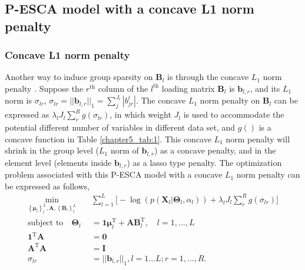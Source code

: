 \subsection{P-ESCA model with a concave L1 norm penalty}
\subsubsection{Concave L1 norm penalty}
Another way to induce group sparsity on $\mathbf{B}_l$ is through the concave $L_1$ norm penalty \cite{huang2012selective}. Suppose the $r^{\text{th}}$ column of the $l^{\text{th}}$ loading matrix $\mathbf{B}_l$ is $\mathbf{b}_{l,r}$, and its $L_1$ norm is $\sigma_{lr}$, $\sigma_{lr} = ||\mathbf{b}_{l,r}||_1 = \sum_{j}^{J_l} |b_{jr}^l|$. The concave $L_1$ norm penalty on $\mathbf{B}_l$ can be expressed as $\lambda_l J_l \sum_{r}^{R} g(\sigma_{lr})$, in which weight $J_l$ is used to accommodate the potential different number of variables in different data set, and $g()$ is a concave function in Table \ref{chapter5_tab:1}. This concave $L_1$ norm penalty will shrink in the group level ($L_1$ norm of $\mathbf{b}_{l,r}$) as a concave penalty, and in the element level (elements inside $\mathbf{b}_{l,r}$) as a lasso type penalty. The optimization problem associated with this P-ESCA model with a concave $L_1$ norm penalty can be expressed as follows,
\begin{equation}\label{chapter6_eq:2}
\begin{aligned}
    \min_{ \left\{\bm{\mu}_l\right\}_{l}^{L}, \mathbf{A}, \left\{\mathbf{B}_l\right\}_{l}^{L}} \quad & \sum_{l=1}^{L} \Big[ -\log(p(\mathbf{X}_l|\mathbf{\Theta}_l, \alpha_l)) + \lambda_l J_l \sum_{r}^{R} g(\sigma_{lr}) \Big] \\
    \text{subject to} \quad \mathbf{\Theta}_l &= \mathbf{1}\bm{\mu}_l^{\text{T}} + \mathbf{AB}_l^{\text{T}}, \quad l = 1,\ldots,L \\
     \mathbf{1}^{\text{T}}\mathbf{A} &= \mathbf{0}\\
	 \mathbf{A}^{\text{T}}\mathbf{A} &= \mathbf{I} \\
	 \sigma_{lr} &= ||\mathbf{b}_{l,r}||_1, l = 1...L; r = 1,\ldots, R.
\end{aligned}
\end{equation}

